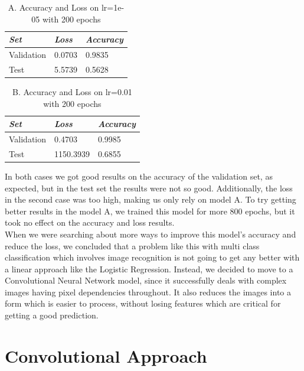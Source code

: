 \documentclass[conference]{IEEEtran}
\begin{document}
\begin{table}[htbp]
\caption{A. Accuracy and Loss on lr=1e-05 with 200 epochs}
\begin{center}
\begin{tabular}{|p{2cm}|p{2cm}|p{2cm}|}
\hline
\textbf{\textit{Set}}& \textbf{\textit{Loss}}& \textbf{\textit{Accuracy}} \\
\hline
Validation & 0.0703 & 0.9835 \\
\hline
Test & 5.5739 & 0.5628 \\
\hline
\end{tabular}
\end{center}
\end{table}

\begin{table}[htbp]
\caption{B.	Accuracy and Loss on lr=0.01 with 200 epochs}
\begin{center}
\begin{tabular}{|p{2cm}|p{2cm}|p{2cm}|}
\hline
\textbf{\textit{Set}}& \textbf{\textit{Loss}}& \textbf{\textit{Accuracy}} \\
\hline
Validation & 0.4703 & 0.9985 \\
\hline
Test & 1150.3939 & 0.6855 \\
\hline
\end{tabular}
\end{center}
\end{table}

In both cases we got good results on the accuracy of the validation set, as expected, but in the test set the results were not so good. Additionally, the loss in the second case was too high, making us only rely on model A.
To try getting better results in the model A, we trained this model for more 800 epochs, but it took no effect on the accuracy and loss results. \\

When we were searching about more ways to improve this model’s accuracy and reduce the loss, we concluded that a problem like this with multi class classification which involves image recognition is not going to get any better with a linear approach like the Logistic Regression. Instead, we decided to move to a Convolutional Neural Network model, since it successfully deals with complex images having pixel dependencies throughout. It also reduces the images into a form which is easier to process, without losing features which are critical for getting a good prediction.\cite{towardsdatascience_Saha}

\section{Convolutional Approach}
\end{document}
